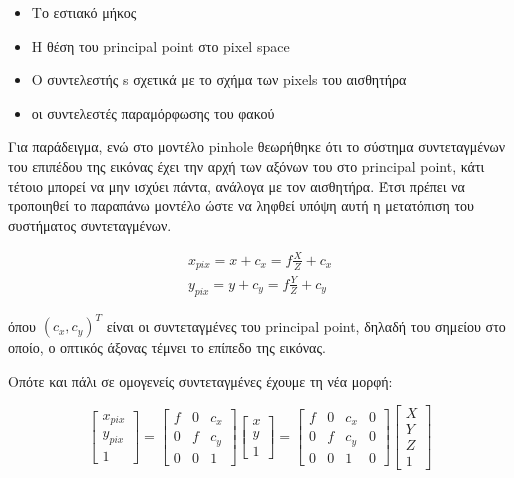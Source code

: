 \begin{itemize}
\item Το εστιακό μήκος
\item Η θέση του principal point στο pixel space
\item Ο συντελεστής s σχετικά με το σχήμα των pixels του αισθητήρα
\item οι συντελεστές παραμόρφωσης του φακού
\end{itemize}



Για παράδειγμα, ενώ στο μοντέλο pinhole θεωρήθηκε ότι το σύστημα συντεταγμένων του επιπέδου της εικόνας έχει την αρχή των αξόνων του στο principal point, κάτι τέτοιο μπορεί να μην ισχύει πάντα, ανάλογα με τον αισθητήρα. Έτσι πρέπει να τροποιηθεί το παραπάνω μοντέλο ώστε να ληφθεί υπόψη αυτή η μετατόπιση του συστήματος συντεταγμένων.


\begin{equation}
\begin{aligned}
x_{pix}=x+c_{x}=f\frac{X}{Z}+c_{x}\\[0.3cm]
y_{pix}=y+c_{y}=f\frac{Y}{Z}+c_{y}
\end{aligned}
\end{equation}

όπου $(c_{x},c_{y})^{T}$ είναι οι συντεταγμένες του principal point, δηλαδή του σημείου στο οποίο, ο οπτικός άξονας τέμνει το επίπεδο της εικόνας. 

Οπότε και πάλι σε ομογενείς συντεταγμένες έχουμε τη νέα μορφή:

\begin{equation}
\begin{bmatrix}
x_{pix}\\y_{pix}\\1
\end{bmatrix}
=
\begin{bmatrix}
f & 0 & c_{x} \\
0 & f & c_{y} \\
0 & 0 & 1 
\end{bmatrix}
\begin{bmatrix}
x\\
y\\
1
\end{bmatrix}
=
\begin{bmatrix}
f & 0 & c_{x} & 0\\
0 & f & c_{y} & 0\\
0 & 0 & 1 & 0
\end{bmatrix}
\begin{bmatrix}
X\\
Y\\
Z\\
1
\end{bmatrix}
\end{equation}




